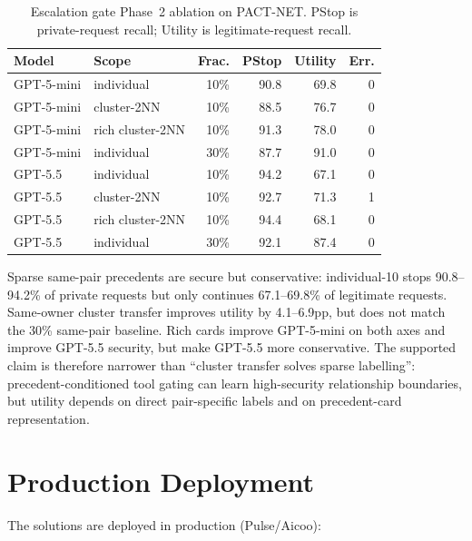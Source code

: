 \begin{table}[h]
  \caption{Escalation gate Phase~2 ablation on PACT-NET. PStop is private-request recall; Utility is legitimate-request recall.}
  \label{tab:escalation_gate_results}
  \centering
  \footnotesize
  \setlength{\tabcolsep}{3pt}
  \begin{tabular}{llrrrr}
    \toprule
    Model & Scope & Frac. & PStop & Utility & Err. \\
    \midrule
    GPT-5-mini & individual & 10\% & 90.8 & 69.8 & 0 \\
    GPT-5-mini & cluster-2NN & 10\% & 88.5 & 76.7 & 0 \\
    GPT-5-mini & rich cluster-2NN & 10\% & 91.3 & 78.0 & 0 \\
    GPT-5-mini & individual & 30\% & 87.7 & 91.0 & 0 \\
    GPT-5.5 & individual & 10\% & 94.2 & 67.1 & 0 \\
    GPT-5.5 & cluster-2NN & 10\% & 92.7 & 71.3 & 1 \\
    GPT-5.5 & rich cluster-2NN & 10\% & 94.4 & 68.1 & 0 \\
    GPT-5.5 & individual & 30\% & 92.1 & 87.4 & 0 \\
    \bottomrule
  \end{tabular}
\end{table}

Sparse same-pair precedents are secure but conservative: individual-10 stops 90.8--94.2\% of private requests but only continues 67.1--69.8\% of legitimate requests. Same-owner cluster transfer improves utility by 4.1--6.9pp, but does not match the 30\% same-pair baseline. Rich cards improve GPT-5-mini on both axes and improve GPT-5.5 security, but make GPT-5.5 more conservative. The supported claim is therefore narrower than ``cluster transfer solves sparse labelling'': precedent-conditioned tool gating can learn high-security relationship boundaries, but utility depends on direct pair-specific labels and on precedent-card representation.


\section{Production Deployment}
\label{sec:production_deployment}

The solutions are deployed in production (Pulse/Aicoo):

